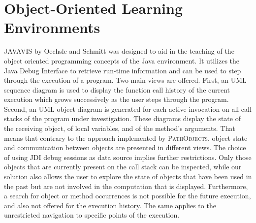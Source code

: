 \section{Object-Oriented Learning Environments}
\textsc{JAVAVIS} by Oechsle and Schmitt \cite{diehl_javavis:_2002} was designed to aid in the teaching of the object oriented programming concepts of the Java environment.
It utilizes the Java Debug Interface to retrieve run-time information and can be used to step through the execution of a program.
Two main views are offered.
First, an UML sequence diagram is used to display the function call history of the current execution which grows successively as the user steps through the program.
Second, an UML object diagram is generated for each active invocation on all call stacks of the program under investigation.
These diagrams display the state of the receiving object, of local variables, and of the method's arguments.
That means that contrary to the approach implemented by \textsc{PathObjects}, object state and communication between objects are presented in different views.
The choice of using JDI debug sessions as data source implies further restrictions.
Only those objects that are currently present on the call stack can be inspected, while our solution also allows the user to explore the state of objects that have been used in the past but are not involved in the computation that is displayed.
Furthermore, a search for object or method occurrences is not possible for the future execution, and also not offered for the execution history.
The same applies to the unrestricted navigation to specific points of the execution.

